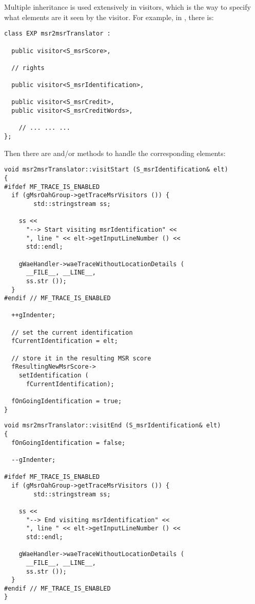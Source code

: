 Multiple inheritance is used extensively in visitors, which is the way to specify what elements are {it seen} by the visitor. For example, in , there is:
\begin{lstlisting}[language=CPlusPlus]
class EXP msr2msrTranslator :

  public visitor<S_msrScore>,

  // rights

  public visitor<S_msrIdentification>,

  public visitor<S_msrCredit>,
  public visitor<S_msrCreditWords>,

    // ... ... ...
};
\end{lstlisting}

Then there are  and/or  methods to handle the corresponding elements:
\begin{lstlisting}[language=CPlusPlus]
void msr2msrTranslator::visitStart (S_msrIdentification& elt)
{
#ifdef MF_TRACE_IS_ENABLED
  if (gMsrOahGroup->getTraceMsrVisitors ()) {
		std::stringstream ss;

    ss <<
      "--> Start visiting msrIdentification" <<
      ", line " << elt->getInputLineNumber () <<
      std::endl;

    gWaeHandler->waeTraceWithoutLocationDetails (
      __FILE__, __LINE__,
      ss.str ());
  }
#endif // MF_TRACE_IS_ENABLED

  ++gIndenter;

  // set the current identification
  fCurrentIdentification = elt;

  // store it in the resulting MSR score
  fResultingNewMsrScore->
    setIdentification (
      fCurrentIdentification);

  fOnGoingIdentification = true;
}
\end{lstlisting}

\begin{lstlisting}[language=CPlusPlus]
void msr2msrTranslator::visitEnd (S_msrIdentification& elt)
{
  fOnGoingIdentification = false;

  --gIndenter;

#ifdef MF_TRACE_IS_ENABLED
  if (gMsrOahGroup->getTraceMsrVisitors ()) {
		std::stringstream ss;

    ss <<
      "--> End visiting msrIdentification" <<
      ", line " << elt->getInputLineNumber () <<
      std::endl;

    gWaeHandler->waeTraceWithoutLocationDetails (
      __FILE__, __LINE__,
      ss.str ());
  }
#endif // MF_TRACE_IS_ENABLED
}
\end{lstlisting}


